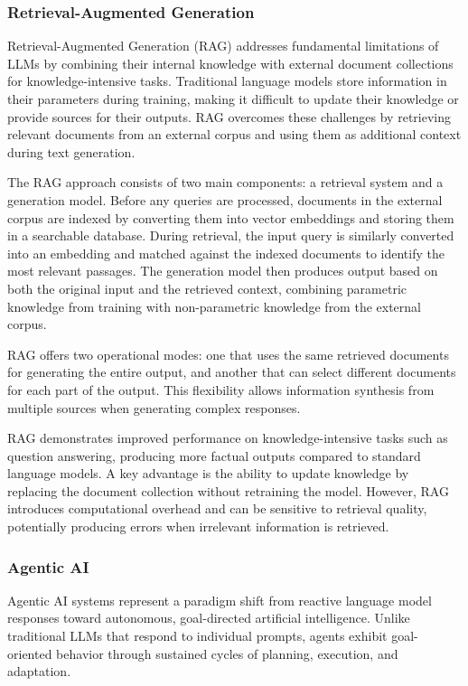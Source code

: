 \def\sectitle{Retrieval-Augmented Generation}
\subsubsection[\sectitle]{\sectitle{} \cite{rag-paper}}
Retrieval-Augmented Generation (RAG) addresses fundamental limitations of LLMs by combining their internal knowledge with external document collections for knowledge-intensive tasks.
Traditional language models store information in their parameters during training, making it difficult to update their knowledge or provide sources for their outputs.
RAG overcomes these challenges by retrieving relevant documents from an external corpus and using them as additional context during text generation.

The RAG approach consists of two main components: a retrieval system and a generation model.
Before any queries are processed, documents in the external corpus are indexed by converting them into vector embeddings and storing them in a searchable database.
During retrieval, the input query is similarly converted into an embedding and matched against the indexed documents to identify the most relevant passages.
The generation model then produces output based on both the original input and the retrieved context, combining parametric knowledge from training with non-parametric knowledge from the external corpus.

RAG offers two operational modes: one that uses the same retrieved documents for generating the entire output, and another that can select different documents for each part of the output.
This flexibility allows information synthesis from multiple sources when generating complex responses.

RAG demonstrates improved performance on knowledge-intensive tasks such as question answering, producing more factual outputs compared to standard language models.
A key advantage is the ability to update knowledge by replacing the document collection without retraining the model.
However, RAG introduces computational overhead and can be sensitive to retrieval quality, potentially producing errors when irrelevant information is retrieved.

\def\sectitle{Agentic AI}
\subsubsection[\sectitle]{\sectitle{} \cite{agent-paper}}
Agentic AI systems represent a paradigm shift from reactive language model responses toward autonomous, goal-directed artificial intelligence.
Unlike traditional LLMs that respond to individual prompts, agents exhibit goal-oriented behavior through sustained cycles of planning, execution, and adaptation.

